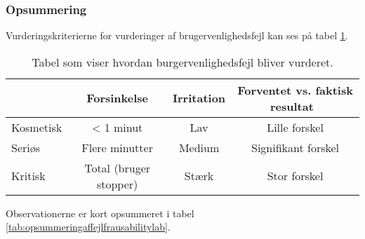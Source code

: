 \subsubsection{Opsummering}
Vurderingskriterierne for vurderinger af brugervenlighedsfejl kan ses på tabel \ref{tab:Brugervejledningsfejlvurdering}.

\begin{table}[H]
\centering
    \begin{tabular}{|l|c|c|c|}
	\hline
	~                           & Forsinkelse 	& Irritation	& Forventet vs. faktisk resultat~ 	\\ \hline
	Kosmetisk       			& < 1 minut   			  		& Lav						 & Lille forskel \\ \hline
	Seriøs       				& Flere minutter 				& Medium					 & Signifikant forskel \\ \hline	
	Kritisk       			    & Total (bruger stopper)  		& Stærk						 & Stor forskel \\ \hline
	
	\end{tabular}
	
\caption{Tabel som viser hvordan burgervenlighedsfejl bliver vurderet. \citep{debslide}}
\label{tab:Brugervejledningsfejlvurdering}

\end{table}

Observationerne er kort opsummeret i tabel \ref{tab:opsummeringaffejlfrausabilitylab}.

